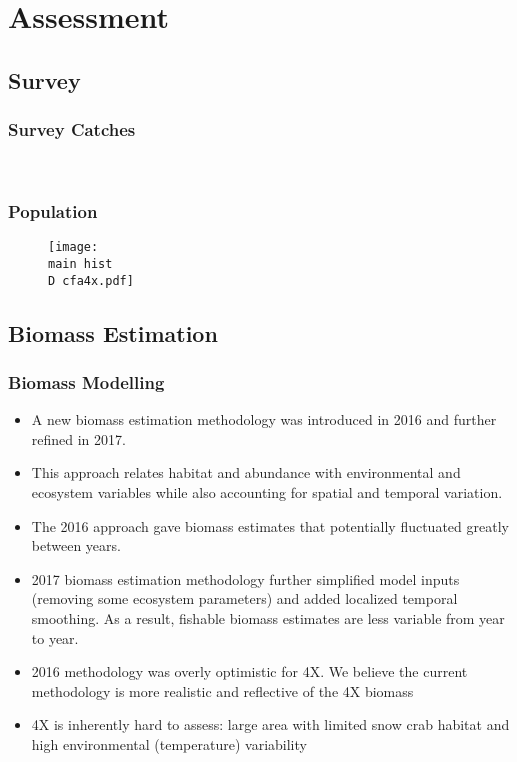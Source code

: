 \documentclass{beamer}
\numberwithin{equation}{section}		%
\numberwithin{figure}{section}	   	%
\numberwithin{table}{section}				%
\newcommand{\D}{.}  %
\newcommand{\main}{C:/bio.data/bio.snowcrab/assessments/2018/presentations/4X/}
\begin{document}
%
\section{Assessment}
\subsection{Survey}
%
\begin{frame}
\frametitle{Survey Catches}
\vspace*{-0.3cm}
\begin{figure}
	\centering
	\
	\
	\
	\
\end{figure}
\end{frame}




\begin{frame}
\frametitle{Population}
\begin{figure}
\centerline{\texttt{[image: \\main hist\\D cfa4x.pdf]}}

\end{figure}
\end{frame}
%

%
\subsection{Biomass Estimation}
%
\begin{frame}
\frametitle{Biomass Modelling}
\begin{itemize}
%
%
\item A new biomass estimation methodology was introduced in 2016 and further refined in 2017. 
\item This approach relates habitat and abundance with environmental and ecosystem variables while also accounting for spatial and temporal variation. 
\item The 2016 approach gave biomass estimates that potentially fluctuated greatly between years.
\item 2017 biomass estimation methodology further simplified model inputs (removing some ecosystem parameters) and added localized temporal smoothing. As a result, fishable biomass estimates are less variable from year to year.
\item 2016 methodology was overly optimistic for 4X. We believe the current methodology is more realistic and reflective of the 4X biomass
\item 4X is inherently hard to assess: large area with limited snow crab habitat and high environmental (temperature) variability 

\end{itemize}
\end{frame}
\end{document}
